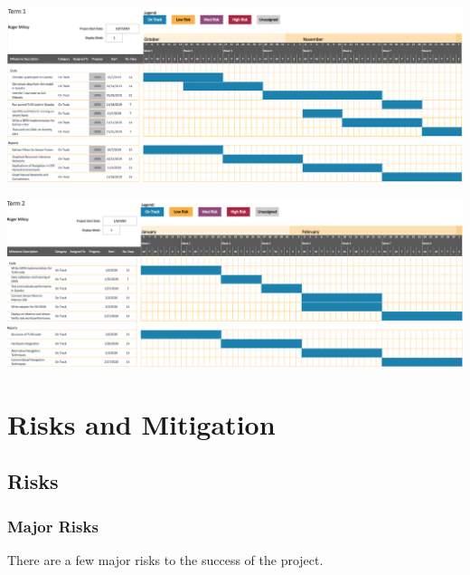 \documentclass[]{../resources/final_report}
\begin{document}
\includegraphics[width=\textwidth]{../resources/images/Term1GanttChart.png}

\vspace{20pt}

\includegraphics[width=\textwidth]{../resources/images/Term2GanttChart.png}


\chapter{Risks and Mitigation}

\section{Risks}
\subsection{Major Risks}

There are a few major risks to the success of the project.
\end{document}
